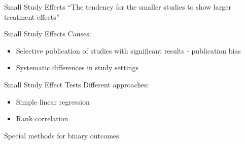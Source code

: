 \documentclass[english]{beamer}\usepackage[]{graphicx}\usepackage[]{color}
\begin{document}
\begin{frame}{Small Study Effects}
``The tendency for the smaller studies to show larger treatment effects'' \citep{Sterne}
\end{frame}


\begin{frame}{Small Study Effects}
Causes:
\begin{itemize}
\item Selective publication of studies with significant results - publication bias
\item Systematic differences in study settings
\end{itemize}
\end{frame}


\begin{frame}{Small Study Effect Tests}
Different approaches:
\begin{itemize}
\item Simple linear regression
\item Rank correlation
\end{itemize}

Special methods for binary outcomes	
\end{frame}


% 
% 
% 
% 
% 
% 
% 
% 
% 
\end{document}
